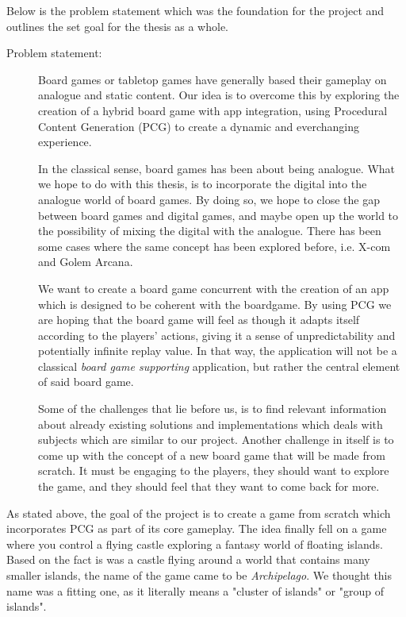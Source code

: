 Below is the problem statement which was the foundation for the project and outlines the set goal for the thesis as a whole.

\begin{description}
\item[Problem statement:]
Board games or tabletop games have generally based their gameplay on analogue and static content. Our idea is to overcome this by exploring the creation of a hybrid board game with app integration, using Procedural Content Generation (PCG) to create a dynamic and everchanging experience.

In the classical sense, board games has been about being analogue. What we hope to do with this thesis, is to incorporate the digital into the analogue world of board games. By doing so, we hope to close the gap between board games and digital games, and maybe open up the world to the possibility of mixing the digital with the analogue. There has been some cases where the same concept has been explored before, i.e. X-com and Golem Arcana.

We want to create a board game concurrent with the creation of an app which is designed to be coherent with the boardgame. By using PCG we are hoping that the board game will feel as though it adapts itself according to the players' actions, giving it a sense of unpredictability and potentially infinite replay value. In that way, the application will not be a classical \textit{board game supporting} application, but rather the central element of said board game.

Some of the challenges that lie before us, is to find relevant information about already existing solutions and implementations which deals with subjects which are similar to our project.
Another challenge in itself is to come up with the concept of a new board game that will be made from scratch. It must be engaging to the players, they should want to explore the game, and they should feel that they want to come back for more.
\end{description}

As stated above, the goal of the project is to create a game from scratch which incorporates PCG as part of its core gameplay. The idea finally fell on a game where you control a flying castle exploring a fantasy world of floating islands. 
Based on the fact is was a castle flying around a world that contains many smaller islands, the name of the game came to be \textit{Archipelago}.
We thought this name was a fitting one, as it literally means a "cluster of islands" or "group of islands".



